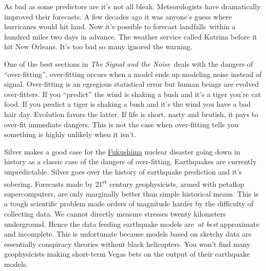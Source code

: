 As bad as some predictors are it's not all bleak. Meteorologists have
dramatically improved their forecasts. A few decades ago it was anyone's
guess where hurricanes would hit land. Now it's possible to forecast
landfalls~within a hundred miles two days in advance. The weather
service called Katrina before it hit New Orleans. It's too bad so many
ignored the warning.

One of the best sections in \emph{The Signal and the Noise}~deals with
the dangers of ``over-fitting'', over-fitting occurs when a model ends
up modeling noise instead of signal. Over-fitting is an egregious
statistical error but human beings are evolved over-fitters. If you
``predict'' the wind is shaking a bush and it's a tiger you're cat food.
If you predict a tiger is shaking a bush and it's the wind you have a
bad hair day. Evolution favors the latter. If life is short, nasty and
brutish, it pays to over-fit immediate dangers. This is not the case
when over-fitting tells you something is highly unlikely when it isn't.

Silver makes a good case for the
\href{http://www.world-nuclear.org/info/Safety-and-Security/Safety-of-Plants/Fukushima-Accident-2011/\#.UVOeghfBOSo}{Fukushima} nuclear
disaster going down in history as a classic case of the dangers of
over-fitting. Earthquakes are currently unpredictable. Silver goes over
the history of earthquake prediction and it's sobering. Forecasts made
by 21\textsuperscript{st} century geophysicists, armed with petaflop
supercomputers, are only marginally better than simple historical means.
This is a tough scientific problem made orders of magnitude harder by
the difficulty of collecting data. We cannot directly measure stresses
twenty kilometers underground. Hence the data feeding earthquake models
are~\emph{at best} approximate and incomplete. This is unfortunate
because models based on sketchy data are essentially conspiracy theories
without black helicopters. You won't find many geophysicists making
short-term Vegas bets on the output of their earthquake models.



